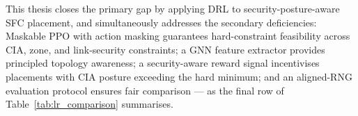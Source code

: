 This thesis closes the primary gap by applying DRL to
security-posture-aware SFC placement, and simultaneously addresses
the secondary deficiencies: Maskable PPO with action masking
guarantees hard-constraint feasibility across CIA, zone, and
link-security constraints; a GNN feature extractor provides principled
topology awareness; a security-aware reward signal incentivises
placements with CIA posture exceeding the hard minimum; and an
aligned-RNG evaluation protocol ensures fair comparison --- as the
final row of Table~\ref{tab:lr_comparison} summarises.
